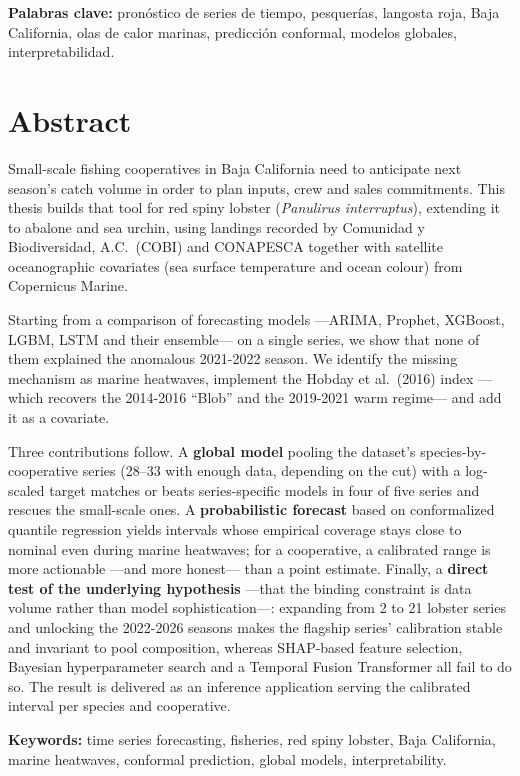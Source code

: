 \vspace{0.5cm}
\noindent\textbf{Palabras clave:} pronóstico de series de tiempo, pesquerías, langosta roja,
Baja California, olas de calor marinas, predicción conformal, modelos globales,
interpretabilidad.

\cleardoublepage

\chapter*{Abstract}

Small-scale fishing cooperatives in Baja California need to anticipate next season's catch
volume in order to plan inputs, crew and sales commitments. This thesis builds that tool for
red spiny lobster (\emph{Panulirus interruptus}), extending it to abalone and sea urchin,
using landings recorded by Comunidad y Biodiversidad, A.C.\ (COBI) and CONAPESCA together
with satellite oceanographic covariates (sea surface temperature and ocean colour) from
Copernicus Marine.

Starting from a comparison of forecasting models ---ARIMA, Prophet, XGBoost, LGBM, LSTM and
their ensemble--- on a single series, we show that none of them explained the anomalous
2021-2022 season. We identify the missing mechanism as marine heatwaves, implement the
Hobday et al.\ (2016) index ---which recovers the 2014-2016 ``Blob'' and the 2019-2021 warm
regime--- and add it as a covariate.

Three contributions follow. A \textbf{global model} pooling the dataset's species-by-cooperative series (28--33 with
enough data, depending on the cut) with a log-scaled target matches or beats series-specific models in four of five series and
rescues the small-scale ones. A \textbf{probabilistic forecast} based on conformalized
quantile regression yields intervals whose empirical coverage stays close to nominal even
during marine heatwaves; for a cooperative, a calibrated range is more actionable ---and
more honest--- than a point estimate. Finally, a \textbf{direct test of the underlying
hypothesis} ---that the binding constraint is data volume rather than model
sophistication---: expanding from 2 to 21 lobster series and unlocking the 2022-2026 seasons
makes the flagship series' calibration stable and invariant to pool composition, whereas
SHAP-based feature selection, Bayesian hyperparameter search and a Temporal Fusion
Transformer all fail to do so. The result is delivered as an inference application serving the
calibrated interval per species and cooperative.

\vspace{0.5cm}
\noindent\textbf{Keywords:} time series forecasting, fisheries, red spiny lobster, Baja
California, marine heatwaves, conformal prediction, global models, interpretability.

\cleardoublepage
